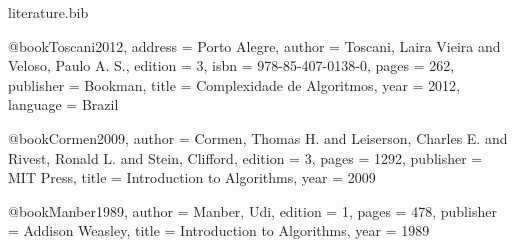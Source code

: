 \begin{filecontents*}{literature.bib}

	@book{Toscani2012,
	address = {Porto Alegre},
	author = {Toscani, Laira Vieira and Veloso, Paulo A. S.},
	edition = {3},
	isbn = {978-85-407-0138-0},
	pages = {262},
	publisher = {Bookman},
	title = {{Complexidade de Algoritmos}},
	year = {2012},
	language = {Brazil}
	}
	
	@book{Cormen2009,
	author = {Cormen, Thomas H. and Leiserson, Charles E. and Rivest, Ronald L. and Stein, Clifford},
	edition = {3},
	pages = {1292},
	publisher = {MIT Press},
	title = {{Introduction to Algorithms}},
	year = {2009}
	}

	@book{Manber1989,
	author = {Manber, Udi},
	edition = {1},
	pages = {478},
	publisher = {Addison Weasley},
	title = {{Introduction to Algorithms}},
	year = {1989}
	}


\end{filecontents*}
